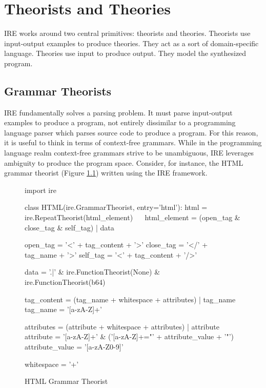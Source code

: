 \chapter{Theorists and Theories}

IRE works around two central primitives: theorists and theories.
Theorists use input-output examples to produce theories.
They act as a sort of domain-specific language.
Theories use input to produce output.
They model the synthesized program.



\section{Grammar Theorists}

IRE fundamentally solves a parsing problem.
It must parse input-output examples to produce a program, not entirely dissimilar to a programming language parser which parses source code to produce a program.
For this reason, it is useful to think in terms of context-free grammars.
While in the programming language realm context-free grammars strive to be unambiguous, IRE leverages ambiguity to produce the program space.
Consider, for instance, the HTML grammar theorist (Figure \ref{fig:html_grammar}) written using the IRE framework.

\begin{figure}[tb]
\begin{pythoncode}
import ire

class HTML(ire.GrammarTheorist, entry='html'):
    html = ire.RepeatTheorist(html_element) ~$\label{html_theorist}$~
    html_element = (open_tag & close_tag & self_tag) | data ~$\label{html_element_theorist}$~

    open_tag = '<' + tag_content + '>'
    close_tag = '</' + tag_name + '>'
    self_tag = '<' + tag_content + '/>'

    data = '.|\n' & ire.FunctionTheorist(None) & ire.FunctionTheorist(b64) ~$\label{data_theorist}$~

    tag_content = (tag_name + whitespace + attributes) | tag_name
    tag_name = '[a-zA-Z]+'

    attributes = (attribute + whitespace + attributes) | attribute
    attribute = '[a-zA-Z]+' & ('[a-zA-Z]+="' + attribute_value + '"')
    attribute_value = '[a-zA-Z0-9]'

    whitespace = '\s+'
\end{pythoncode}
\caption{HTML Grammar Theorist}
\label{fig:html_grammar}
\end{figure}

